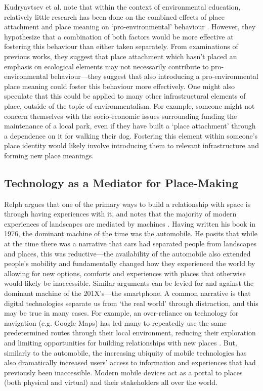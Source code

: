 Kudryavtsev et al. note that within the context of environmental education, relatively little research has been done on the combined effects of place attachment and place meaning on `pro-environmental' behaviour \citep{Kudryavtsev2012}. However, they hypothesize that a combination of both factors would be more effective at fostering this behaviour than either taken separately. From examinations of previous works, they suggest that place attachment which hasn't placed an emphasis on ecological elements may not necessarily contribute to pro-environmental behaviour---they suggest that also introducing a pro-environmental place meaning could foster this behaviour more effectively. One might also speculate that this could be applied to many other infrastructural elements of place, outside of the topic of environmentalism. For example, someone might not concern themselves with the socio-economic issues surrounding funding the maintenance of a local park, even if they have built a `place attachment' through a dependence on it for walking their dog. Fostering this element within someone's place identity would likely involve introducing them to relevant infrastructure and forming new place meanings. 

\subsection{Technology as a Mediator for Place-Making}
\label{sec:TechMediator}
Relph argues that one of the primary ways to build a relationship with space is through having experiences with it, and notes that the majority of modern experiences of landscapes are mediated by machines \citep{Relph1976}. Having written his book in 1976, the dominant machine of the time was the automobile. He posits that while at the time there was a narrative that cars had separated people from landscapes and places, this was reductive---the availability of the automobile also extended people's mobility and fundamentally changed how they experienced the world by allowing for new options, comforts and experiences with places that otherwise would likely be inaccessible. Similar arguments can be levied for and against the dominant machine of the 201X's---the smartphone. A common narrative is that digital technologies separate us from `the real world' through distraction, and this may be true in many cases. For example, an over-reliance on technology for navigation (e.g. Google Maps) has led many to repeatedly use the same predetermined routes through their local environment, reducing their exploration and limiting opportunities for building relationships with new places \citep{Lochtefeld2019}. But, similarly to the automobile, the increasing ubiquity of mobile technologies has also dramatically increased users' access to information and experiences that had previously been inaccessible. Modern mobile devices act as a portal to places (both physical and virtual) and their stakeholders all over the world.

